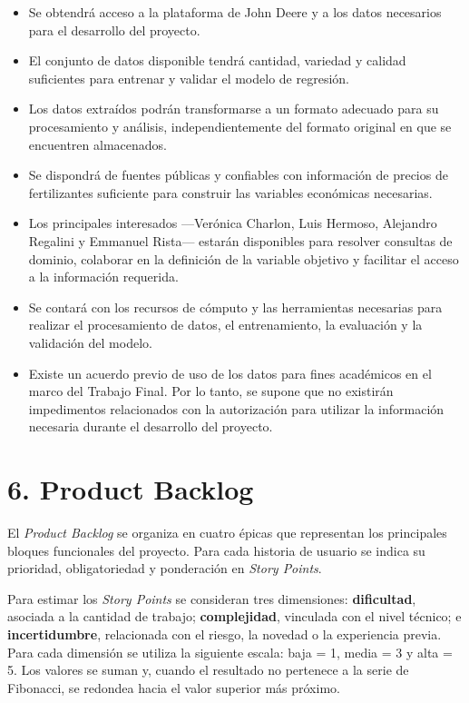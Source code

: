 \documentclass[
11pt, %
]{charter}
\begin{document}
\begin{itemize}
\item Se obtendrá acceso a la plataforma de John Deere y a los datos necesarios para el desarrollo del proyecto.
\item El conjunto de datos disponible tendrá cantidad, variedad y calidad suficientes para entrenar y validar el modelo de regresión.
\item Los datos extraídos podrán transformarse a un formato adecuado para su procesamiento y análisis, independientemente del formato original en que se encuentren almacenados.
\item Se dispondrá de fuentes públicas y confiables con información de precios de fertilizantes suficiente para construir las variables económicas necesarias.
\item Los principales interesados —Verónica Charlon, Luis Hermoso, Alejandro Regalini y Emmanuel Rista— estarán disponibles para resolver consultas de dominio, colaborar en la definición de la variable objetivo y facilitar el acceso a la información requerida.
\item Se contará con los recursos de cómputo y las herramientas necesarias para realizar el procesamiento de datos, el entrenamiento, la evaluación y la validación del modelo.
\item Existe un acuerdo previo de uso de los datos para fines académicos en el marco del Trabajo Final. Por lo tanto, se supone que no existirán impedimentos relacionados con la autorización para utilizar la información necesaria durante el desarrollo del proyecto.
\end{itemize}





\section{6. Product Backlog}
\label{sec:backlog}

El \textit{Product Backlog} se organiza en cuatro épicas que representan los principales bloques funcionales del proyecto. Para cada historia de usuario se indica su prioridad, obligatoriedad y ponderación en \textit{Story Points}.

Para estimar los \textit{Story Points} se consideran tres dimensiones: \textbf{dificultad}, asociada a la cantidad de trabajo; \textbf{complejidad}, vinculada con el nivel técnico; e \textbf{incertidumbre}, relacionada con el riesgo, la novedad o la experiencia previa. Para cada dimensión se utiliza la siguiente escala: baja = 1, media = 3 y alta = 5. Los valores se suman y, cuando el resultado no pertenece a la serie de Fibonacci, se redondea hacia el valor superior más próximo.
\end{document}
